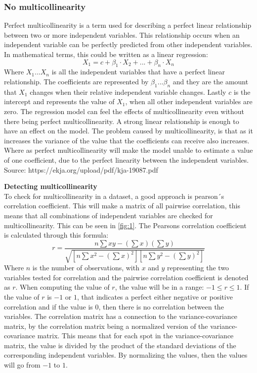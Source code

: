 \subsubsection{No multicollinearity}
Perfect multicollinearity is a term used for describing a perfect linear relationship between two or more independent variables. This relationship occurs when an independent variable can be perfectly predicted from other independent variables. In mathematical terms, this could be written as a linear regression:
$$
X_1 = c+\beta_1\cdot X_2+...+\beta_n\cdot X_n
$$ 
Where $X_1...X_n$ is all the independent variables that have a perfect linear relationship. The coefficients are represented by $\beta_1...\beta_n$ and they are the amount that $X_1$ changes when their relative independent variable changes.
Lastly $c$ is the intercept and represents the value of $X_1$, when all other independent variables are zero.
\newline
The regression model can feel the effects of multicollinearity even without there being perfect multicollinearity. A strong linear relationship is enough to have an effect on the model. The problem caused by multicollinearity, is that as it increases the variance of the value that the coefficients can receive also increases. Where as perfect multicollinearity will make the model unable to estimate a value of one coefficient, due to the perfect linearity between the independent variables.
\newline
Source: https://ekja.org/upload/pdf/kja-19087.pdf

\noindent \textbf{Detecting multicollinearity}\\
To check for multicollinearity in a dataset, a good approach is pearson´s correlation coefficient. This will make a matrix of all pairwise correlation, this means that all combinations of independent variables are checked for multicollinearity. This can be seen in \autoref{fig:1}. The Pearsons correlation coefficient is calculated through this formula:
$$
r = \frac{n \sum xy - (\sum x)(\sum y)}{\sqrt{[n \sum x^2 - (\sum x)^2][n \sum y^2 - (\sum y)^2]}}
$$
Where $n$ is the number of observations, with $x$ and $y$ representing the two variables tested for correlation and the pairwise correlation coefficient is denoted as $r$. When computing the value of $r$, the value will be in a range: $-1\leq r \leq 1$. If the value of $r$ is $-1$ or $1$, that indicates a perfect either negative or positive correlation and if the value is $0$, then there is no correlation between the variables. The correlation matrix has a connection to the variance-covariance matrix, by the correlation matrix being a normalized version of the variance-covariance matrix. This means that for each spot in the variance-covariance matrix, the value is divided by the product of the standard deviations of the corresponding independent variables. By normalizing the values, then the values will go from $-1$ to $1$.






